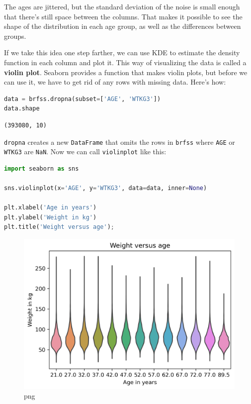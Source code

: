 \documentclass[
]{book}
\newcommand{\passthrough}[1]{#1}
\begin{document}
The ages are jittered, but the standard deviation of the noise is small
enough that there's still space between the columns. That makes it
possible to see the shape of the distribution in each age group, as well
as the differences between groups.

If we take this idea one step farther, we can use KDE to estimate the
density function in each column and plot it. This way of visualizing the
data is called a \textbf{violin plot}. Seaborn provides a function that
makes violin plots, but before we can use it, we have to get rid of any
rows with missing data. Here's how:

\begin{lstlisting}[language=Python]
data = brfss.dropna(subset=['AGE', 'WTKG3'])
data.shape
\end{lstlisting}

\begin{lstlisting}
(393080, 10)
\end{lstlisting}

\passthrough{\lstinline!dropna!} creates a new
\passthrough{\lstinline!DataFrame!} that omits the rows in
\passthrough{\lstinline!brfss!} where \passthrough{\lstinline!AGE!} or
\passthrough{\lstinline!WTKG3!} are \passthrough{\lstinline!NaN!}. Now
we can call \passthrough{\lstinline!violinplot!} like this:

\begin{lstlisting}[language=Python]
import seaborn as sns

sns.violinplot(x='AGE', y='WTKG3', data=data, inner=None)

plt.xlabel('Age in years')
plt.ylabel('Weight in kg')
plt.title('Weight versus age');
\end{lstlisting}

\begin{figure}
\centering
\includegraphics{09_relationships_files/09_relationships_43_0.png}
\caption{png}
\end{figure}
\end{document}
